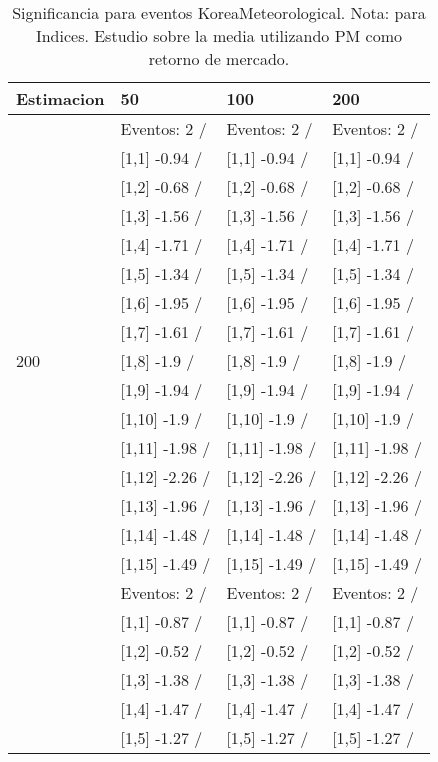 \begin{table}

\caption{Significancia para eventos KoreaMeteorological. Nota: para Indices. Estudio sobre la media utilizando PM como retorno de mercado.}
\centering
\begin{tabular}[t]{llll}
\toprule
Estimacion & 50 & 100 & 200\\
\midrule
 & Eventos:  2 / & Eventos:  2 / & Eventos:  2 /\\
 & {}[1,1] -0.94  / & {}[1,1] -0.94  / & {}[1,1] -0.94  /\\
 & {}[1,2] -0.68  / & {}[1,2] -0.68  / & {}[1,2] -0.68  /\\
 & {}[1,3] -1.56  / & {}[1,3] -1.56  / & {}[1,3] -1.56  /\\
 & {}[1,4] -1.71  / & {}[1,4] -1.71  / & {}[1,4] -1.71  /\\
\addlinespace
 & {}[1,5] -1.34  / & {}[1,5] -1.34  / & {}[1,5] -1.34  /\\
 & {}[1,6] -1.95  / & {}[1,6] -1.95  / & {}[1,6] -1.95  /\\
 & {}[1,7] -1.61  / & {}[1,7] -1.61  / & {}[1,7] -1.61  /\\
200 & {}[1,8] -1.9  / & {}[1,8] -1.9  / & {}[1,8] -1.9  /\\
 & {}[1,9] -1.94  / & {}[1,9] -1.94  / & {}[1,9] -1.94  /\\
\addlinespace
 & {}[1,10] -1.9  / & {}[1,10] -1.9  / & {}[1,10] -1.9  /\\
 & {}[1,11] -1.98  / & {}[1,11] -1.98  / & {}[1,11] -1.98  /\\
 & {}[1,12] -2.26  / & {}[1,12] -2.26  / & {}[1,12] -2.26  /\\
 & {}[1,13] -1.96  / & {}[1,13] -1.96  / & {}[1,13] -1.96  /\\
 & {}[1,14] -1.48  / & {}[1,14] -1.48  / & {}[1,14] -1.48  /\\
\addlinespace
 & {}[1,15] -1.49  / & {}[1,15] -1.49  / & {}[1,15] -1.49  /\\
 & Eventos:  2 / & Eventos:  2 / & Eventos:  2 /\\
 & {}[1,1] -0.87  / & {}[1,1] -0.87  / & {}[1,1] -0.87  /\\
 & {}[1,2] -0.52  / & {}[1,2] -0.52  / & {}[1,2] -0.52  /\\
 & {}[1,3] -1.38  / & {}[1,3] -1.38  / & {}[1,3] -1.38  /\\
\addlinespace
 & {}[1,4] -1.47  / & {}[1,4] -1.47  / & {}[1,4] -1.47  /\\
 & {}[1,5] -1.27  / & {}[1,5] -1.27  / & {}[1,5] -1.27  /\\

\end{tabular}
\end{table}
